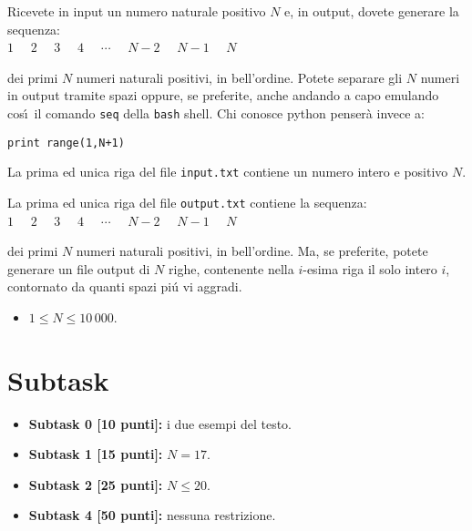 \renewcommand{\nomebreve}{for1\_file}
\renewcommand{\titolo}{Primo esercizio sul {\tt for} - emulare il comando {\tt seq} della {\tt bash}}

\introduzione{}

Ricevete in input un numero naturale positivo $N$ e,
in output, dovete generare la sequenza:\\

  $1$  \ \ $2$  \ \ $3$  \ \ $4$  \ \ $\cdots$  \ \ $N-2$  \ \ $N-1$  \ \ $N$

dei primi $N$ numeri naturali positivi, in bell'ordine.
Potete separare gli $N$ numeri in output tramite spazi oppure, se preferite, anche andando a capo emulando cos\'\i\ il comando \verb'seq' della \verb'bash' shell.
Chi conosce python penser\`a invece a:

\verb'print range(1,N+1)'


La prima ed unica riga del file \verb'input.txt' contiene un numero intero e positivo $N$.

La prima ed unica riga del file \verb'output.txt' contiene
la sequenza:\\

  $1$  \ \ $2$  \ \ $3$  \ \ $4$  \ \ $\cdots$  \ \ $N-2$  \ \ $N-1$  \ \ $N$

dei primi $N$ numeri naturali positivi, in bell'ordine.
Ma, se preferite,
potete generare un file output di $N$ righe,
contenente nella $i$-esima riga il solo intero $i$, contornato da quanti spazi pi\'u vi aggradi.



\begin{itemize}[nolistsep, noitemsep]
  \item $1 \le N \le 10\,000$.
\end{itemize}
  
  \section*{Subtask}
  \begin{itemize}
    \item \textbf{Subtask 0 [10 punti]:} i due esempi del testo.
    \item \textbf{Subtask 1 [15 punti]:} $N = 17$.
    \item \textbf{Subtask 2 [25 punti]:} $N \leq 20$.
    \item \textbf{Subtask 4 [50 punti]:} nessuna restrizione.
  \end{itemize}
  
